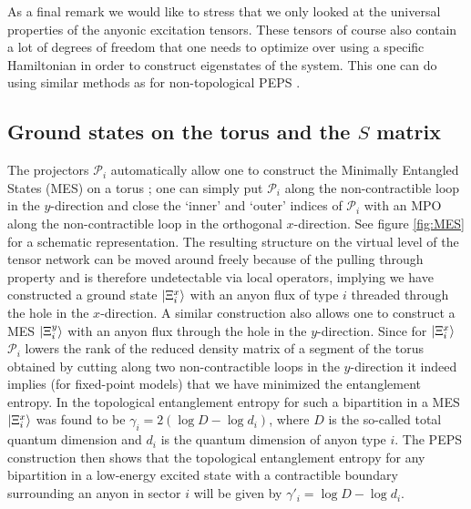 \documentclass[12 pt]{article}
\begin{document}
As a final remark we would like to stress that we only looked at the universal properties of the anyonic excitation tensors. These tensors of course also contain a lot of degrees of freedom that one needs to optimize over using a specific Hamiltonian in order to construct eigenstates of the system. This one can do using similar methods as for non-topological PEPS \cite{Haegeman,Vanderstraeten}.


\subsection{Ground states on the torus and the $S$ matrix}\label{sec:Smatrix}

The projectors $\mathcal{P}_i$ automatically allow one to construct the Minimally Entangled States (MES) on a torus \cite{MES};  one can simply put $\mathcal{P}_i$ along the non-contractible loop in the $y$-direction and close the `inner' and `outer' indices of $\mathcal{P}_i$ with an MPO along the non-contractible loop in the orthogonal $x$-direction. See figure \ref{fig:MES} for a schematic representation. The resulting structure on the virtual level of the tensor network can be moved around freely because of the pulling through property and is therefore undetectable via local operators, implying we have constructed a ground state $\ket{\Xi^x_i}$ with an anyon flux of type $i$ threaded through the hole in the $x$-direction. A similar construction also allows one to construct a MES $\ket{\Xi^y_i}$ with an anyon flux through the hole in the $y$-direction. Since for $\ket{\Xi^x_i}$ $\mathcal{P}_i$ lowers the rank of the reduced density matrix of a segment of the torus obtained by cutting along two non-contractible loops in the $y$-direction it indeed implies (for fixed-point models) that we have minimized the entanglement entropy. In \cite{MES} the topological entanglement entropy for such a bipartition in a MES $\ket{\Xi^x_i}$ was found to be $\gamma_i = 2(\log D - \log d_i)$, where $D$ is the so-called total quantum dimension and $d_i$ is the quantum dimension of anyon type $i$. The PEPS construction then shows that the topological entanglement entropy for any bipartition in a low-energy excited state with a contractible boundary surrounding an anyon in sector $i$ will be given by $\gamma'_i = \log D - \log d_i$.
\end{document}
